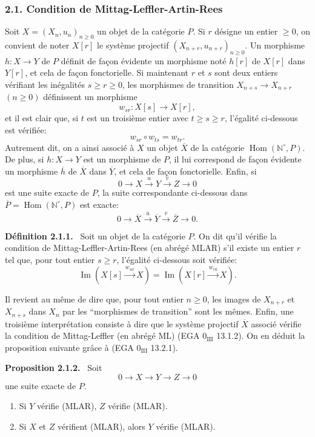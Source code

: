 \documentclass[11pt]{article}
\providecommand{\NN}{\mathbb{N}}
\newenvironment{statement}[1]{\par\medskip\noindent\textbf{#1.}\ }{\par\medskip}
\DeclareMathOperator{\Hom}{Hom}
\providecommand{\Hom}{\operatorname{Hom}}
\providecommand{\NN}{\mathbb N}
\providecommand{\Im}{\operatorname{Im}}
\renewcommand{\Im}{\operatorname{Im}}
\providecommand{\Im}{\operatorname{Im}}
\providecommand{\Hom}{\operatorname{Hom}}
\begin{document}
\subsubsection*{2.1. Condition de Mittag-Leffler-Artin-Rees}
Soit $X=(X_n,u_n)_{n\ge0}$ un objet de la catégorie $P$. Si $r$ désigne un entier $\ge0$, on convient de noter $X[r]$ le système projectif $(X_{n+r},u_{n+r})_{n\ge0}$. Un morphisme $h:X\to Y$ de $P$ définit de façon évidente un morphisme noté $h[r]$ de $X[r]$ dans $Y[r]$, et cela de façon fonctorielle. Si maintenant $r$ et $s$ sont deux entiers vérifiant les inégalités $s\ge r\ge0$, les morphismes de transition $X_{n+s}\to X_{n+r}$ $(n\ge0)$ définissent un morphisme
\[
w_{sr}:X[s]\longrightarrow X[r],
\]
et il est clair que, si $t$ est un troisième entier avec $t\ge s\ge r$, l'égalité ci-dessous est vérifiée:
\[
w_{sr}\circ w_{ts}=w_{tr}.
\]
Autrement dit, on a ainsi associé à $X$ un objet $\overline X$ de la catégorie $\Hom(\NN^\circ,P)$. De plus, si $h:X\to Y$ est un morphisme de $P$, il lui correspond de façon évidente un morphisme $\overline h$ de $\overline X$ dans $\overline Y$, et cela de façon fonctorielle. Enfin, si
\[
0\longrightarrow X\stackrel{u}{\longrightarrow}Y\stackrel{v}{\longrightarrow}Z\longrightarrow0
\]
est une suite exacte de $P$, la suite correspondante ci-dessous dans $\overline P=\Hom(\NN^\circ,P)$ est exacte:
\[
0\longrightarrow\overline X\stackrel{\overline u}{\longrightarrow}\overline Y\stackrel{\overline v}{\longrightarrow}\overline Z\longrightarrow0.
\]

\begin{statement}{Définition 2.1.1}
Soit un objet de la catégorie $P$. On dit qu'il vérifie la condition de Mittag-Leffler-Artin-Rees (en abrégé MLAR) s'il existe un entier $r$ tel que, pour tout entier $s\ge r$, l'égalité ci-dessous soit vérifiée:
\[
\Im(X[s]\xrightarrow{w_{s0}}X)=\Im(X[r]\xrightarrow{w_{r0}}X).
\]
\end{statement}
Il revient au même de dire que, pour tout entier $n\ge0$, les images de $X_{n+r}$ et $X_{n+s}$ dans $X_n$ par les ``morphismes de transition'' sont les mêmes. Enfin, une troisième interprétation consiste à dire que le système projectif $\overline X$ associé vérifie la condition de Mittag-Leffler (en abrégé ML) (EGA $0_{\mathrm{III}}$ 13.1.2). On en déduit la proposition suivante grâce à (EGA $0_{\mathrm{III}}$ 13.2.1).

\begin{statement}{Proposition 2.1.2}
Soit
\[
0\longrightarrow X\longrightarrow Y\longrightarrow Z\longrightarrow0
\]
une suite exacte de $P$.
\begin{enumerate}[label=(\roman*)]
\item Si $Y$ vérifie (MLAR), $Z$ vérifie (MLAR).
\item Si $X$ et $Z$ vérifient (MLAR), alors $Y$ vérifie (MLAR).
\end{enumerate}
\end{statement}
\end{document}
